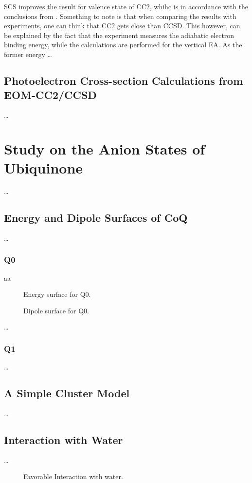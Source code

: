 SCS improves the result for valence state of CC2, whihc is in accordance with the conclusions from \cite{paran2024performance}. Something to note is that when comparing the results with experiments, one can think that CC2 gets close than CCSD. This however, can be explained by the fact that the experiment measures the adiabatic electron binding energy, while the calculations are performed for the vertical EA. As the former energy 
\ldots
\subsection{Photoelectron Cross-section Calculations from EOM-CC2/CCSD}

\ldots
\section{Study on the Anion States of Ubiquinone}

\ldots
\subsection{Energy and Dipole Surfaces of CoQ}

\ldots
\subsubsection{Q0}
aa
\begin{figure}[th!]
  \centering
  
  \caption[Short caption for Table of Figures]{Energy surface for Q0.}
  \label{fig:Q0_E}
\end{figure}
\begin{figure}[th!]
  \centering
  
  \caption[Short caption for Table of Figures]{Dipole surface for Q0.}
  \label{fig:Q0_d}
\end{figure}

\ldots
\subsubsection{Q1}

\ldots
\subsection{A Simple Cluster Model}
\ldots

\subsection{Interaction with Water}
\ldots
\begin{figure}[th!]
    \centering
    
    \caption[Short caption for Table of Figures]{Favorable Interaction with water.}
    \label{fig:H2O_fav}
\end{figure}

